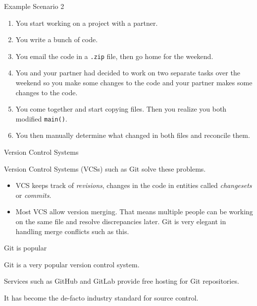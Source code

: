 \documentclass{beeper}
\begin{document}
\begin{frame}{Example Scenario 2}

    \begin{enumerate}[<+->]
        \item You start working on a project with a partner.
        \item You write a bunch of code.
        \item You email the code in a \texttt{.zip} file, then go home for the
            weekend.
        \item You and your partner had decided to work on two separate tasks
            over the weekend so you make some changes to the code and your
            partner makes some changes to the code.
        \item You come together and start copying files. Then you realize you
            both modified \texttt{main()}.
        \item You then manually determine what changed in both files and
            reconcile them.
    \end{enumerate}

\end{frame}

\begin{frame}{Version Control Systems}

    Version Control Systems (VCSs) such as Git solve these problems.

    \begin{itemize}[<+->]
        \item VCS keeps track of \textit{revisions}, changes in the code in
            entities called \textit{changesets} or \textit{commits}.
        \item Most VCS allow version merging. That means multiple people can be
            working on the same file and resolve discrepancies later. Git is
            very elegant in handling merge conflicts such as this.
    \end{itemize}
\end{frame}

\begin{frame}{Git is popular}

    Git is a very popular version control system.

    Services such as GitHub and GitLab provide free hosting for Git
    repositories.

    It has become the de-facto industry standard for source control.

\end{frame}
\end{document}
